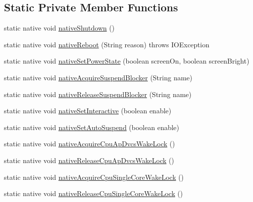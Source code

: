 \subsection*{Static Private Member Functions}
\begin{DoxyCompactItemize}
\item 
static native void \hyperlink{classcom_1_1android_1_1server_1_1power_1_1PowerManagerService_a788cbc41a0e97dab627da5d125426fe8}{native\-Shutdown} ()
\item 
static native void \hyperlink{classcom_1_1android_1_1server_1_1power_1_1PowerManagerService_aaa6a3ca635982188b713421c38f256d2}{native\-Reboot} (String reason)  throws I\-O\-Exception
\item 
static native void \hyperlink{classcom_1_1android_1_1server_1_1power_1_1PowerManagerService_a913f12c5b2d091157b208fdefaac32fa}{native\-Set\-Power\-State} (boolean screen\-On, boolean screen\-Bright)
\item 
static native void \hyperlink{classcom_1_1android_1_1server_1_1power_1_1PowerManagerService_a3f7161cf8f28cb36b59f93b4d91afc9d}{native\-Acquire\-Suspend\-Blocker} (String name)
\item 
static native void \hyperlink{classcom_1_1android_1_1server_1_1power_1_1PowerManagerService_a1ece5a179df435cf2550360677d86a8c}{native\-Release\-Suspend\-Blocker} (String name)
\item 
static native void \hyperlink{classcom_1_1android_1_1server_1_1power_1_1PowerManagerService_ab1cf15410e70a723cd627a6bf2a8092b}{native\-Set\-Interactive} (boolean enable)
\item 
static native void \hyperlink{classcom_1_1android_1_1server_1_1power_1_1PowerManagerService_a8f3eeb9a6150f543880eb9f8f132563d}{native\-Set\-Auto\-Suspend} (boolean enable)
\item 
static native void \hyperlink{classcom_1_1android_1_1server_1_1power_1_1PowerManagerService_af607b14a3c769243afdec1ffe6706a9d}{native\-Acquire\-Cpu\-Ap\-Dvcs\-Wake\-Lock} ()
\item 
static native void \hyperlink{classcom_1_1android_1_1server_1_1power_1_1PowerManagerService_ab74390f4ca5fe26ede4cfbad3e842492}{native\-Release\-Cpu\-Ap\-Dvcs\-Wake\-Lock} ()
\item 
static native void \hyperlink{classcom_1_1android_1_1server_1_1power_1_1PowerManagerService_a7f2750073f5c2571eb00dedf77574ef3}{native\-Acquire\-Cpu\-Single\-Core\-Wake\-Lock} ()
\item 
static native void \hyperlink{classcom_1_1android_1_1server_1_1power_1_1PowerManagerService_a8bceafabddd9f05025a9eaba9c7c52d1}{native\-Release\-Cpu\-Single\-Core\-Wake\-Lock} ()

\end{DoxyCompactItemize}
